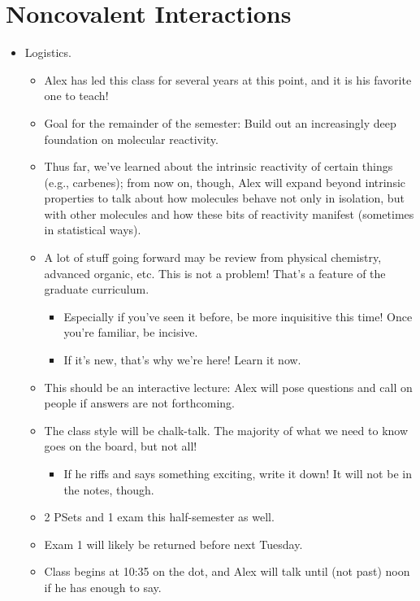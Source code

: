 \documentclass[../notes.tex]{subfiles}
\begin{document}
\section{Noncovalent Interactions}
\begin{itemize}
    \item {}Logistics.
    \begin{itemize}
        \item Alex has led this class for several years at this point, and it is his favorite one to teach!
        \item Goal for the remainder of the semester: Build out an increasingly deep foundation on molecular reactivity.
        \item Thus far, we've learned about the intrinsic reactivity of certain things (e.g., carbenes); from now on, though, Alex will expand beyond intrinsic properties to talk about how molecules behave not only in isolation, but with other molecules and how these bits of reactivity manifest (sometimes in statistical ways).
        \item A lot of stuff going forward may be review from physical chemistry, advanced organic, etc. This is not a problem! That's a feature of the graduate curriculum.
        \begin{itemize}
            \item Especially if you've seen it before, be more inquisitive this time! Once you're familiar, be incisive.
            \item If it's new, that's why we're here! Learn it now.
        \end{itemize}
        \item This should be an interactive lecture: Alex will pose questions and call on people if answers are not forthcoming.
        \item The class style will be chalk-talk. The majority of what we need to know goes on the board, but not all!
        \begin{itemize}
            \item If he riffs and says something exciting, write it down! It will not be in the notes, though.
        \end{itemize}
        \item 2 PSets and 1 exam this half-semester as well.
        \item Exam 1 will likely be returned before next Tuesday.
        \item Class begins at 10:35 on the dot, and Alex will talk until (not past) noon if he has enough to say.

\end{itemize}
\end{itemize}
\end{document}

